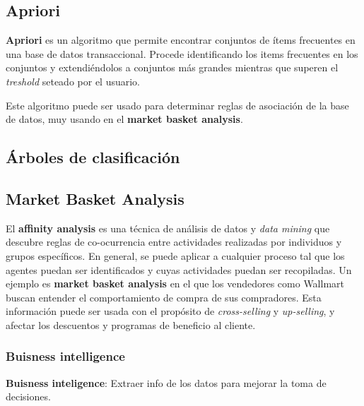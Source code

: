\documentclass[]{article}
\begin{document}
\subsection{Apriori}
\textbf{Apriori} es un algoritmo que permite encontrar conjuntos de ítems frecuentes en una base de datos transaccional. Procede identificando los items frecuentes en los conjuntos y extendiéndolos a conjuntos más grandes mientras que superen el \emph{treshold} seteado por el usuario.

Este algoritmo puede ser usado para determinar reglas de asociación de la base de datos, muy usando en el \textbf{market basket analysis}.

\subsection{Árboles de clasificación}

\subsection{Market Basket Analysis}
El \textbf{affinity analysis} es una técnica de análisis de datos y \textit{data mining} que descubre reglas de co-ocurrencia entre actividades realizadas por individuos y grupos específicos. En general, se puede aplicar a cualquier proceso tal que los agentes puedan ser identificados y cuyas actividades puedan ser recopiladas. Un ejemplo es \textbf{market basket analysis} en el que los vendedores como Wallmart buscan entender el comportamiento de compra de sus compradores. Esta información puede ser usada con el propósito de \textit{cross-selling} y \textit{up-selling}, y afectar los descuentos y programas de beneficio al cliente.

\subsubsection{Buisness intelligence}
\textbf{Buisness inteligence}: Extraer info de los datos para mejorar la toma de decisiones.
\end{document}

